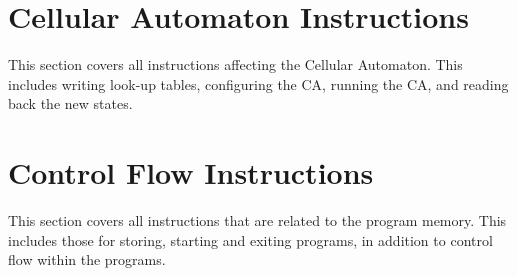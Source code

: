 \documentclass[a4paper,twoside,12pt]{article}
\begin{document}












\cleardoublepage
\section{Cellular Automaton Instructions}

This section covers all instructions affecting the Cellular Automaton.
This includes writing look-up tables, configuring the CA, running the CA, and reading back the new states.








\cleardoublepage
\section{Control Flow Instructions}

This section covers all instructions that are related to the program memory.
This includes those for storing, starting and exiting programs, in addition to control flow within the programs.










\end{document}
